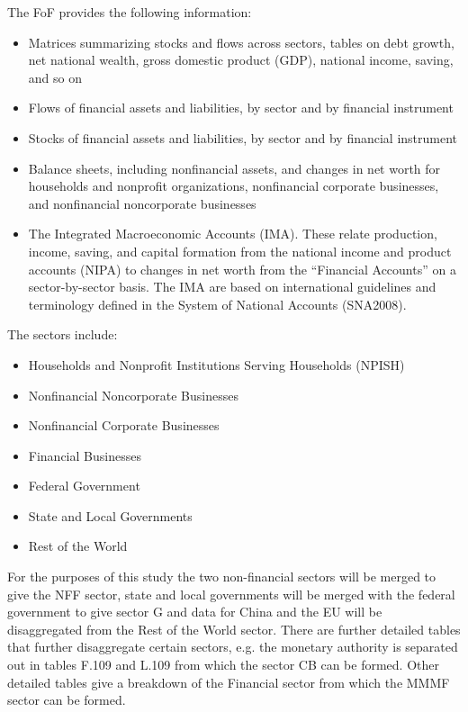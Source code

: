 \documentclass[twoside,a4paper,11pt]{article}
\begin{document}
The FoF provides the following information:
\begin{itemize}
\item[] Matrices summarizing stocks and flows across sectors, tables on debt growth, net national wealth, gross domestic product (GDP), national income, saving, and so on
\item[] Flows of financial assets and liabilities, by sector and by financial instrument
\item[] Stocks of financial assets and liabilities, by sector and by financial instrument
\item[] Balance sheets, including nonfinancial assets, and changes in net worth for households and nonprofit organizations, nonfinancial corporate businesses, and nonfinancial noncorporate businesses
\item[] The Integrated Macroeconomic Accounts (IMA). These relate production, income, saving, and capital formation from the national income and product accounts (NIPA) to changes in net worth from the “Financial Accounts” on a sector-by-sector basis. The IMA  are based on international guidelines and terminology defined in the System of National Accounts (SNA2008).
\end{itemize}
The sectors include:
\begin{itemize}
\item[] Households and Nonprofit Institutions Serving Households (NPISH)
\item[] Nonfinancial Noncorporate Businesses
\item[] Nonfinancial Corporate Businesses
\item[] Financial Businesses
\item[] Federal Government
\item[] State and Local Governments
\item[] Rest of the World
\end{itemize}
For the purposes of this study the two non-financial sectors will be merged to give the NFF sector, state and local governments will be merged with the federal government to give sector G and data for China and the EU will be disaggregated from the Rest of the World sector. There are further detailed tables that further disaggregate certain sectors, e.g. the monetary authority is separated out in tables F.109 and L.109 from which the sector CB can be formed. Other detailed tables give a breakdown of the Financial sector from which the MMMF sector can be formed. 

\end{document}
